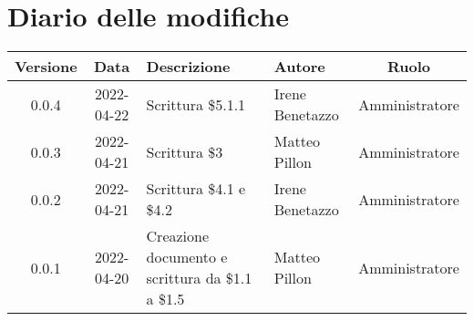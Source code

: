 \section*{Diario delle modifiche}
	\begin{center}
	\renewcommand{\arraystretch}{1.8} %
	\begin{tabular}{ |c|c|m{12em}|m{7em}|c| }
	\hline
	\textbf{Versione} & \textbf{Data} & \textbf{Descrizione} &  \textbf{Autore} &  \textbf{Ruolo} \\ %
	\hline
	0.0.4 & 2022-04-22 & Scrittura \$5.1.1 & Irene Benetazzo & Amministratore\\
	\hline 
	0.0.3 & 2022-04-21 & Scrittura \$3 & Matteo Pillon & Amministratore\\
	\hline
	0.0.2 & 2022-04-21 & Scrittura \$4.1 e \$4.2 & Irene Benetazzo & Amministratore\\
	\hline
    0.0.1 & 2022-04-20 & Creazione documento e scrittura da \$1.1 a \$1.5 & Matteo Pillon & Amministratore\\ %
	\hline
	\end{tabular}
	\end{center}
	\newpage